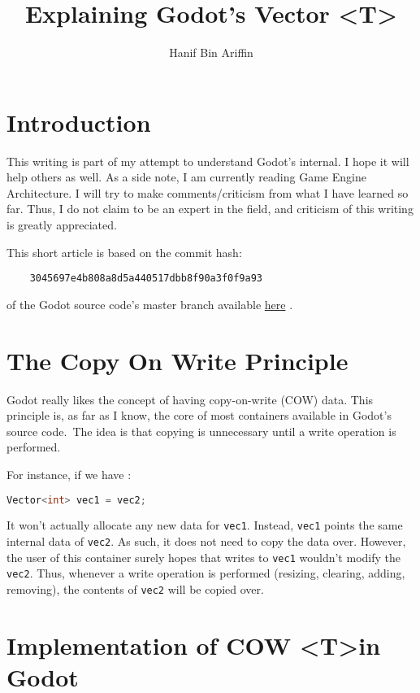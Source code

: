 \documentclass[a4paper,10pt]{book}
\title{Explaining Godot's Vector \textless T\textgreater }
\author{Hanif Bin Ariffin}
\begin{document}
\maketitle
\tableofcontents

\newpage
\section{Introduction}

This writing is part of my attempt to understand Godot's internal.
I hope it will help others as well.
As a side note, I am currently reading Game Engine Architecture.
I will try to make comments/criticism from what I have learned so far.
Thus, I do not claim to be an expert in the field, and criticism of this writing is greatly appreciated.

This short article is based on the commit hash:

\begin{lstlisting}
    3045697e4b808a8d5a440517dbb8f90a3f0f9a93
\end{lstlisting}

of the Godot source code's master branch available \href{https://github.com/godotengine/godot}{here} .

\section{The Copy On Write Principle}

Godot really likes the concept of having copy-on-write (COW) data.
This principle is, as far as I know, the core of most containers available in Godot's source code.\
The idea is that copying is unnecessary until a write operation is performed.

For instance, if we have :

\begin{lstlisting}[language=c++]
    Vector<int> vec1 = vec2;
\end{lstlisting}

It won't actually allocate any new data for \texttt{vec1}.
Instead, \texttt{vec1} points the same internal data of \texttt{vec2}.
As such, it does not need to copy the data over.
However, the user of this container surely hopes that writes to \texttt{vec1} wouldn't modify the \texttt{vec2}.
Thus, whenever a write operation is performed (resizing, clearing, adding, removing), the contents of \texttt{vec2} will be copied over.

\newpage
\section{Implementation of COW  \textless T\textgreater in Godot}
\end{document}
